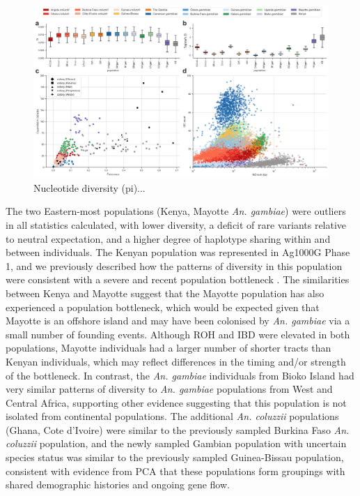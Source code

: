 \documentclass[a4paper,11pt,abstracton,hidelinks]{scrartcl}
\begin{document}
\begin{figure}[H]
	\begin{center}
		\includegraphics*[width=6.3in]{artwork/diversity_composite.jpeg}
	\end{center}
	\caption{Nucleotide diversity (pi)...}
	\label{div}
\end{figure}


%
The two Eastern-most populations (Kenya, Mayotte \textit{An. gambiae}) were outliers in all statistics calculated, with lower diversity, a deficit of rare variants relative to neutral expectation, and a higher degree of haplotype sharing within and between individuals.
%
The Kenyan population was represented in Ag1000G Phase 1, and we previously described how the patterns of diversity in this population were consistent with a severe and recent population bottleneck \cite{Ag1000gConsortium2017}.
%
The similarities between Kenya and Mayotte suggest that the Mayotte population has also experienced a population bottleneck, which would be expected given that Mayotte is an offshore island and may have been colonised by \textit{An. gambiae} via a small number of founding events.
%
Although ROH and IBD were elevated in both populations, Mayotte individuals had a larger number of shorter tracts than Kenyan individuals, which may reflect differences in the timing and/or strength of the bottleneck.
%
In contrast, the \textit{An. gambiae} individuals from Bioko Island had very similar patterns of diversity to \textit{An. gambiae} populations from West and Central Africa, supporting other evidence suggesting that this population is not isolated from continental populations.
%
The additional \textit{An. coluzzii} populations (Ghana, Cote d'Ivoire) were similar to the previously sampled Burkina Faso \textit{An. coluzzii} population, and the newly sampled Gambian population with uncertain species status was similar to the previously sampled Guinea-Bissau population, consistent with evidence from PCA that these populations form groupings with shared demographic histories and ongoing gene flow.
\end{document}
